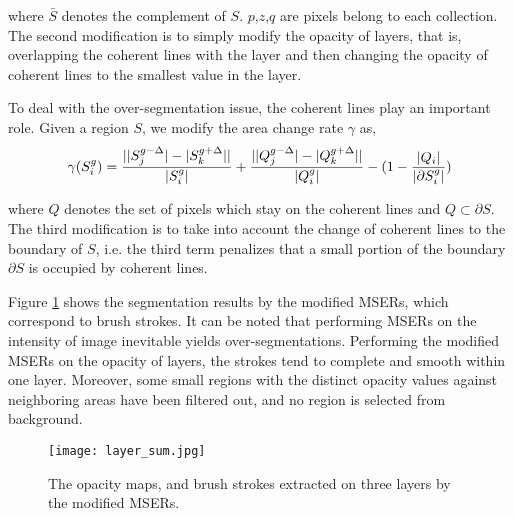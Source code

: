 where $ \bar{S} $ denotes the complement of $S$. $p$,$z$,$q$ are pixels belong to each collection. The second modification is to simply modify the opacity of layers, that is, overlapping the coherent lines with the layer and then changing the opacity of coherent lines to the smallest value in the layer.

To deal with the over-segmentation issue, the coherent lines play an important role. Given a region $S$, we modify the area change rate $\gamma$ as,
\begin{equation}
\gamma(S_i^g)=\frac{  \lvert \lvert S_j^{g-\Delta}\rvert -\lvert S_k^{g+\Delta} \rvert
	 \rvert     }{\arrowvert S_i^g\arrowvert} + \frac{  \lvert \lvert Q_j^{g-\Delta}\rvert -\lvert Q_k^{g+\Delta} \rvert
	 \rvert     }{\arrowvert Q_i^g\arrowvert} - (1-\frac{\lvert Q_i\rvert}{\lvert \partial S_i^g \rvert} )
\end{equation}


where $Q$ denotes the set of pixels which stay on the coherent lines and $Q \subset \partial S $. The third modification is to take into account the change of coherent lines to the boundary of $S$, i.e. the third term penalizes that a small portion of the boundary $\partial S$ is occupied by coherent lines.

Figure \ref{mser:alpha} shows the segmentation results by the modified MSERs, which correspond to brush strokes. It can be noted that performing MSERs on the intensity of image inevitable yields over-segmentations. Performing the modified MSERs on the opacity of layers, the strokes tend to complete and smooth within one layer. Moreover, some small regions with the distinct opacity values against neighboring areas have been filtered out, and no region is selected from background. 
\begin{figure}[H]
	\centering 
	\texttt{[image: layer\_sum.jpg]}
	\caption{The opacity maps, and brush strokes extracted on three layers by the modified MSERs.}
	\label{mser:alpha}
\end{figure}

